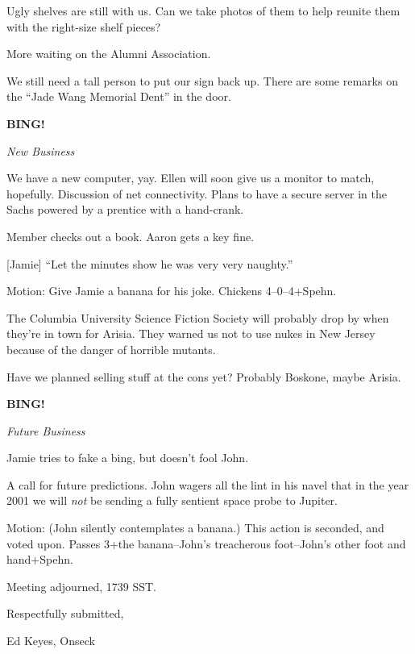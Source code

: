 \documentclass[12pt]{article}
\newcommand{\bing}{{\bf BING!} }
\newcommand{\goto}[1]{\bing \vskip 12pt \centerline{{\em{#1}}}}
\begin{document}
Ugly shelves are still with us.  Can we take photos of them to help
reunite them with the right-size shelf pieces?

More waiting on the Alumni Association.

We still need a tall person to put our sign back up.  There are some
remarks on the ``Jade Wang Memorial Dent'' in the door.

\goto{New Business}

We have a new computer, yay.  Ellen will soon give us a monitor to
match, hopefully.  Discussion of net connectivity.  Plans to have a
secure server in the Sachs powered by a prentice with a hand-crank.

Member checks out a book.  Aaron gets a key fine.

[Jamie] ``Let the minutes show he was very very naughty.''

Motion: Give Jamie a banana for his joke.  Chickens 4--0--4+Spehn.

The Columbia University Science Fiction Society will probably drop
by when they're in town for Arisia.  They warned us not to use nukes
in New Jersey because of the danger of horrible mutants.

Have we planned selling stuff at the cons yet?  Probably Boskone,
maybe Arisia.

\goto{Future Business}

Jamie tries to fake a bing, but doesn't fool John.

A call for future predictions.  John wagers all the lint in his navel
that in the year 2001 we will {\em not} be sending a fully sentient
space probe to Jupiter.

Motion: (John silently contemplates a banana.)  This action is seconded,
and voted upon.  Passes 3+the banana--John's treacherous foot--John's
other foot and hand+Spehn.

\vspace{12pt}

\noindent
Meeting adjourned, 1739 SST.

\vspace{18pt}

\centerline{Respectfully submitted,}
\centerline{Ed Keyes, Onseck}
\end{document}
